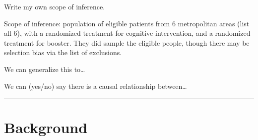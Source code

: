 \documentclass[11pt]{article}
\begin{document}
Write my own scope of inference.

Scope of inference: population of eligible patients from 6 metropolitan areas (list all 6), with a randomized treatment for cognitive intervention, and a randomized treatment for booster. They did sample the eligible people, though there may be selection bias via the list of exclusions.

We can generalize this to\ldots{}

We can (yes/no) say there is a causal relationship between\ldots{}

\noindent\rule{\textwidth}{0.5pt}

\section{Background}
\label{sec:org48d9df0}
\end{document}
